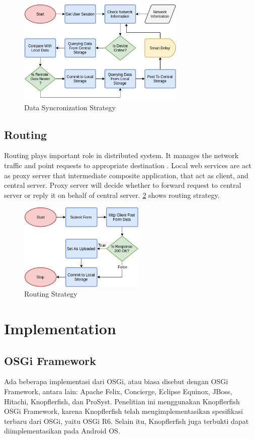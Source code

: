 \documentclass[conference]{IEEEtran}
\begin{document}
\begin{figure}
    \centering
    \includegraphics[width=8cm]{../Images/data-sync-flowchart}
    \caption{Data Syncronization Strategy}
    \label{fig:data-sync-flowchart}
\end{figure}




\subsection{Routing}
Routing plays important role in distributed system. It manages the network traffic and point requests to appropriate destination \cite{takdir_multi-layer_2014}. Local web services are act as proxy server that intermediate composite application, that act as client, and central server. Proxy server will decide whether to forward request to central server or reply it on behalf of central server. \figurename{\ref{fig:routing-flowchart}} shows routing strategy.

\begin{figure}
    \centering
    \includegraphics[width=6cm]{../Images/routing-flowchart}
    \caption{Routing Strategy}
    \label{fig:routing-flowchart}
\end{figure}



\section{Implementation}


\subsection{OSGi Framework}
Ada beberapa implementasi dari OSGi, atau biasa disebut dengan OSGi Framework, antara lain: Apache Felix, Concierge, Eclipse Equinox, JBoss, Hitachi, Knopflerfish, dan ProSyst. Penelitian ini menggunakan Knopflerfish OSGi Framework, karena Knopflerfish telah mengimplementasikan spesifikasi terbaru dari OSGi, yaitu OSGi R6. Selain itu, Knopflerfish juga terbukti dapat diimplementasikan pada Android OS.
\end{document}

